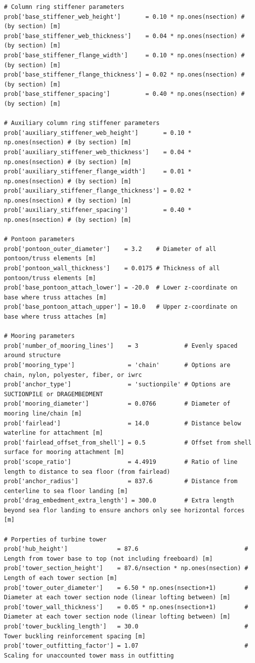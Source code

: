 \begin{lstlisting}
# Column ring stiffener parameters
prob['base_stiffener_web_height']       = 0.10 * np.ones(nsection) # (by section) [m]
prob['base_stiffener_web_thickness']    = 0.04 * np.ones(nsection) # (by section) [m]
prob['base_stiffener_flange_width']     = 0.10 * np.ones(nsection) # (by section) [m]
prob['base_stiffener_flange_thickness'] = 0.02 * np.ones(nsection) # (by section) [m]
prob['base_stiffener_spacing']          = 0.40 * np.ones(nsection) # (by section) [m]

# Auxiliary column ring stiffener parameters
prob['auxiliary_stiffener_web_height']       = 0.10 * np.ones(nsection) # (by section) [m]
prob['auxiliary_stiffener_web_thickness']    = 0.04 * np.ones(nsection) # (by section) [m]
prob['auxiliary_stiffener_flange_width']     = 0.01 * np.ones(nsection) # (by section) [m]
prob['auxiliary_stiffener_flange_thickness'] = 0.02 * np.ones(nsection) # (by section) [m]
prob['auxiliary_stiffener_spacing']          = 0.40 * np.ones(nsection) # (by section) [m]

# Pontoon parameters
prob['pontoon_outer_diameter']    = 3.2    # Diameter of all pontoon/truss elements [m]
prob['pontoon_wall_thickness']    = 0.0175 # Thickness of all pontoon/truss elements [m]
prob['base_pontoon_attach_lower'] = -20.0  # Lower z-coordinate on base where truss attaches [m]
prob['base_pontoon_attach_upper'] = 10.0   # Upper z-coordinate on base where truss attaches [m]

# Mooring parameters
prob['number_of_mooring_lines']    = 3             # Evenly spaced around structure
prob['mooring_type']               = 'chain'       # Options are chain, nylon, polyester, fiber, or iwrc
prob['anchor_type']                = 'suctionpile' # Options are SUCTIONPILE or DRAGEMBEDMENT
prob['mooring_diameter']           = 0.0766        # Diameter of mooring line/chain [m]
prob['fairlead']                   = 14.0          # Distance below waterline for attachment [m]
prob['fairlead_offset_from_shell'] = 0.5           # Offset from shell surface for mooring attachment [m]
prob['scope_ratio']                = 4.4919        # Ratio of line length to distance to sea floor (from fairlead)
prob['anchor_radius']              = 837.6         # Distance from centerline to sea floor landing [m]
prob['drag_embedment_extra_length'] = 300.0        # Extra length beyond sea flor landing to ensure anchors only see horizontal forces [m]

# Porperties of turbine tower
prob['hub_height']              = 87.6                              # Length from tower base to top (not including freeboard) [m]
prob['tower_section_height']    = 87.6/nsection * np.ones(nsection) # Length of each tower section [m]
prob['tower_outer_diameter']    = 6.50 * np.ones(nsection+1)        # Diameter at each tower section node (linear lofting between) [m]
prob['tower_wall_thickness']    = 0.05 * np.ones(nsection+1)        # Diameter at each tower section node (linear lofting between) [m]
prob['tower_buckling_length']   = 30.0                              # Tower buckling reinforcement spacing [m]
prob['tower_outfitting_factor'] = 1.07                              # Scaling for unaccounted tower mass in outfitting


\end{lstlisting}
